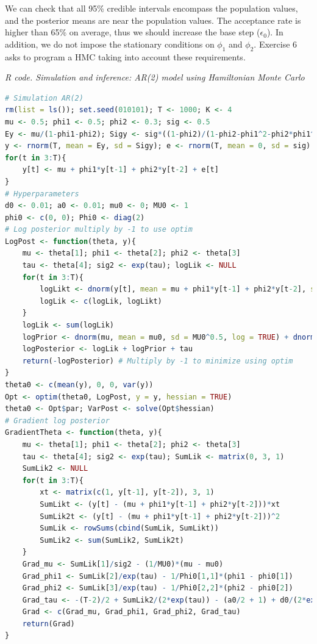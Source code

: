 We can check that all 95\% credible intervals encompass the population values, and the posterior means are near the population values. The acceptance rate is higher than 65\% on average, thus we should increase the base step ($\epsilon_0$). In addition, we do not impose the stationary conditions on $\phi_1$ and $\phi_2$. Exercise 6 asks to program a HMC taking into account these requirements.

\begin{tcolorbox}[enhanced,width=4.67in,center upper,
	fontupper=\large\bfseries,drop shadow southwest,sharp corners]
	\textit{R code. Simulation and inference: AR(2) model using Hamiltonian Monte Carlo}
	\begin{VF}
		\begin{lstlisting}[language=R]
# Simulation AR(2)
rm(list = ls()); set.seed(010101); T <- 1000; K <- 4 
mu <- 0.5; phi1 <- 0.5; phi2 <- 0.3; sig <- 0.5 
Ey <- mu/(1-phi1-phi2); Sigy <- sig*((1-phi2)/(1-phi2-phi1^2-phi2*phi1^2-phi2^2+phi2^3))^0.5 
y <- rnorm(T, mean = Ey, sd = Sigy); e <- rnorm(T, mean = 0, sd = sig)
for(t in 3:T){
	y[t] <- mu + phi1*y[t-1] + phi2*y[t-2] + e[t]
}
# Hyperparameters
d0 <- 0.01; a0 <- 0.01; mu0 <- 0; MU0 <- 1
phi0 <- c(0, 0); Phi0 <- diag(2)
# Log posterior multiply by -1 to use optim
LogPost <- function(theta, y){
	mu <- theta[1]; phi1 <- theta[2]; phi2 <- theta[3]
	tau <- theta[4]; sig2 <- exp(tau); logLik <- NULL
	for(t in 3:T){
		logLikt <- dnorm(y[t], mean = mu + phi1*y[t-1] + phi2*y[t-2], sd = sig2^0.5, log = TRUE)
		logLik <- c(logLik, logLikt)
	}
	logLik <- sum(logLik)
	logPrior <- dnorm(mu, mean = mu0, sd = MU0^0.5, log = TRUE) + dnorm(phi1, mean = phi0[1], sd = Phi0[1,1]^0.5, log = TRUE) + dnorm(phi2, mean = phi0[2], sd = Phi0[2,2]^0.5, log = TRUE) + invgamma::dinvgamma(sig2, shape = a0/2, rate = d0/2, log = TRUE)
	logPosterior <- logLik + logPrior + tau
	return(-logPosterior) # Multiply by -1 to minimize using optim
}
theta0 <- c(mean(y), 0, 0, var(y))
Opt <- optim(theta0, LogPost, y = y, hessian = TRUE)
theta0 <- Opt$par; VarPost <- solve(Opt$hessian)
# Gradient log posterior
GradientTheta <- function(theta, y){
	mu <- theta[1]; phi1 <- theta[2]; phi2 <- theta[3]
	tau <- theta[4]; sig2 <- exp(tau); SumLik <- matrix(0, 3, 1)
	SumLik2 <- NULL
	for(t in 3:T){
		xt <- matrix(c(1, y[t-1], y[t-2]), 3, 1)
		SumLikt <- (y[t] - (mu + phi1*y[t-1] + phi2*y[t-2]))*xt
		SumLik2t <- (y[t] - (mu + phi1*y[t-1] + phi2*y[t-2]))^2
		SumLik <- rowSums(cbind(SumLik, SumLikt))
		SumLik2 <- sum(SumLik2, SumLik2t)
	}
	Grad_mu <- SumLik[1]/sig2 - (1/MU0)*(mu - mu0)
	Grad_phi1 <- SumLik[2]/exp(tau) - 1/Phi0[1,1]*(phi1 - phi0[1])
	Grad_phi2 <- SumLik[3]/exp(tau) - 1/Phi0[2,2]*(phi2 - phi0[2])
	Grad_tau <- -(T-2)/2 + SumLik2/(2*exp(tau)) - (a0/2 + 1) + d0/(2*exp(tau)) + 1 
	Grad <- c(Grad_mu, Grad_phi1, Grad_phi2, Grad_tau)
	return(Grad)
}
\end{lstlisting}
	\end{VF}
\end{tcolorbox}

